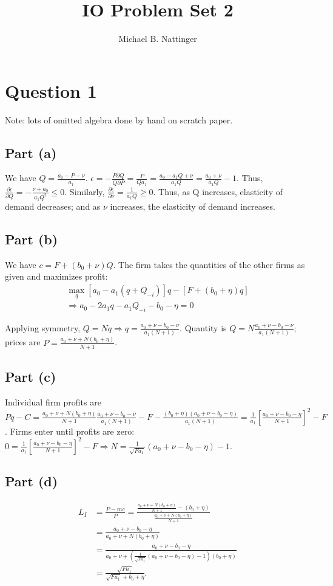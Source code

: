 \documentclass[11pt]{article} %
\title{IO Problem Set 2}
\author{Michael B. Nattinger}
\begin{document}
\maketitle

\section{Question 1}
Note: lots of omitted algebra done by hand on scratch paper.
\subsection{Part (a)}
We have $Q = \frac{a_0 - P - \nu}{a_1}$. $\epsilon = - \frac{P \partial Q}{Q \partial P} = \frac{P}{Qa_1} = \frac{a_0 - a_1 Q + \nu}{a_1Q} = \frac{a_0 + \nu}{a_1Q} - 1.$ Thus, $\frac{\partial \epsilon}{\partial Q} = -\frac{\nu + a_0}{a_1Q^2} \leq 0$. Similarly, $\frac{\partial \epsilon}{\partial  \nu} = \frac{1}{a_1Q} \geq 0$. Thus, as Q increases, elasticity of demand decreases; and as $\nu$ increases, the elasticity of demand increases.

\subsection{Part (b)}
We have $c = F + (b_0 + \nu)Q$. The firm takes the quantities of the other firms as given and maximizes profit:
\begin{align*}
\max_{q}[a_0 - a_1(q + Q_{-i})]q - [F+(b_0 + \eta)q]\\
\Rightarrow a_0 -2a_1q - a_1Q_{-i} - b_0 - \eta = 0 
\end{align*}

Applying symmetry, $Q = Nq \Rightarrow q = \frac{a_0 + \nu - b_0 - \nu}{a_1(N+1)}$. Quantity is $Q = N\frac{a_0 + \nu - b_0 - \nu}{a_1(N+1)}$; prices are $P = \frac{a_0 + \nu + N(b_0 + \eta)}{N+1}$.

\subsection{Part (c)}
Individual firm profits are $Pq - C =  \frac{a_0 + \nu + N(b_0 + \eta)}{N+1} \frac{a_0 + \nu - b_0 - \nu}{a_1(N+1)} - F - \frac{(b_0 + \eta)(a_0 + \nu - b_0 - \eta)}{a_1(N+1)} = \frac{1}{a_1}\left[ \frac{a_0 + \nu - b_0 - \eta}{N+1}\right]^2 - F$. Firms enter until profits are zero: $0 = \frac{1}{a_1}\left[ \frac{a_0 + \nu - b_0 - \eta}{N+1}\right]^2 - F \Rightarrow N = \frac{1}{\sqrt{Fa_1}}(a_0 + \nu - b_0 - \eta) - 1$.
\subsection{Part (d)}
\begin{align*}
L_I &= \frac{P - mc}{P} = \frac{\frac{a_0 + \nu + N(b_0 + \eta)}{N+1} - (b_0 + \eta)}{\frac{a_0 + \nu + N(b_0 + \eta)}{N+1}} \\
&= \frac{a_0 + \nu - b_0 - \eta}{a_0 + \nu + N(b_0 + \eta)} \\
&=  \frac{a_0 + \nu - b_0 - \eta}{a_0 + \nu + \left(\frac{1}{\sqrt{Fa_1}}(a_0 + \nu - b_0 - \eta) - 1\right)(b_0 + \eta)} \\
&= \frac{\sqrt{Fa_1}}{\sqrt{Fa_1}+b_0 + \eta}.
\end{align*}
\end{document}
